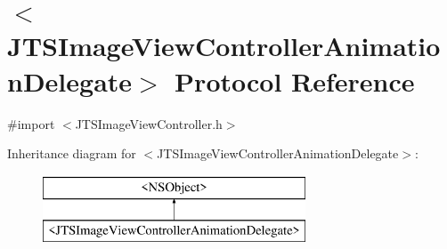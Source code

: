 \hypertarget{protocol_j_t_s_image_view_controller_animation_delegate-p}{}\section{$<$J\+T\+S\+Image\+View\+Controller\+Animation\+Delegate$>$ Protocol Reference}
\label{protocol_j_t_s_image_view_controller_animation_delegate-p}


{\ttfamily \#import $<$J\+T\+S\+Image\+View\+Controller.\+h$>$}

Inheritance diagram for $<$J\+T\+S\+Image\+View\+Controller\+Animation\+Delegate$>$\+:\begin{figure}[H]
\begin{center}
\leavevmode
\includegraphics[height=2.000000cm]{protocol_j_t_s_image_view_controller_animation_delegate-p}
\end{center}
\end{figure}
